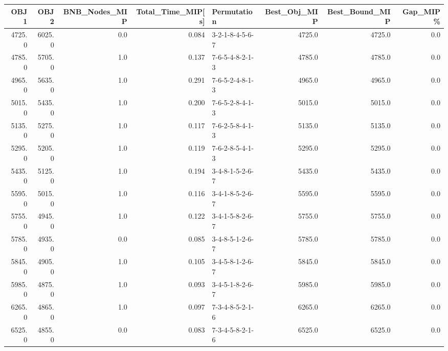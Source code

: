 \begin{tabular}{rrrrlrrr}
\toprule
   OBJ1 &    OBJ2 &  BNB\_Nodes\_MIP &  Total\_Time\_MIP[s] &      Permutation &  Best\_Obj\_MIP &  Best\_Bound\_MIP &  Gap\_MIP\% \\
\midrule
 4725.0 &  6025.0 &            0.0 &              0.084 &  3-2-1-8-4-5-6-7 &        4725.0 &          4725.0 &       0.0 \\
 4785.0 &  5705.0 &            1.0 &              0.137 &  7-6-5-4-8-2-1-3 &        4785.0 &          4785.0 &       0.0 \\
 4965.0 &  5635.0 &            1.0 &              0.291 &  7-6-5-2-4-8-1-3 &        4965.0 &          4965.0 &       0.0 \\
 5015.0 &  5435.0 &            1.0 &              0.200 &  7-6-5-2-8-4-1-3 &        5015.0 &          5015.0 &       0.0 \\
 5135.0 &  5275.0 &            1.0 &              0.117 &  7-6-2-5-8-4-1-3 &        5135.0 &          5135.0 &       0.0 \\
 5295.0 &  5205.0 &            1.0 &              0.119 &  7-6-2-8-5-4-1-3 &        5295.0 &          5295.0 &       0.0 \\
 5435.0 &  5125.0 &            1.0 &              0.194 &  3-4-8-1-5-2-6-7 &        5435.0 &          5435.0 &       0.0 \\
 5595.0 &  5015.0 &            1.0 &              0.116 &  3-4-1-8-5-2-6-7 &        5595.0 &          5595.0 &       0.0 \\
 5755.0 &  4945.0 &            1.0 &              0.122 &  3-4-1-5-8-2-6-7 &        5755.0 &          5755.0 &       0.0 \\
 5785.0 &  4935.0 &            0.0 &              0.085 &  3-4-8-5-1-2-6-7 &        5785.0 &          5785.0 &       0.0 \\
 5845.0 &  4905.0 &            1.0 &              0.105 &  3-4-5-8-1-2-6-7 &        5845.0 &          5845.0 &       0.0 \\
 5985.0 &  4875.0 &            1.0 &              0.093 &  3-4-5-1-8-2-6-7 &        5985.0 &          5985.0 &       0.0 \\
 6265.0 &  4865.0 &            1.0 &              0.097 &  7-3-4-8-5-2-1-6 &        6265.0 &          6265.0 &       0.0 \\
 6525.0 &  4855.0 &            0.0 &              0.083 &  7-3-4-5-8-2-1-6 &        6525.0 &          6525.0 &       0.0 \\
\bottomrule
\end{tabular}
